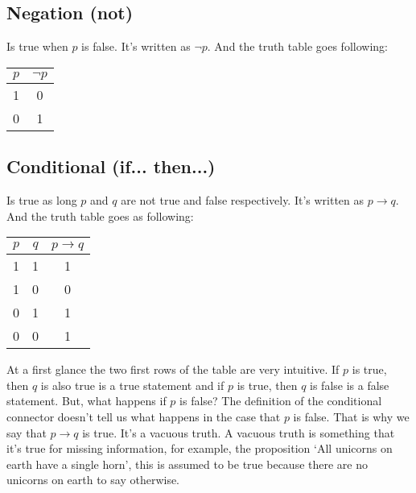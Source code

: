 \documentclass{report}
\begin{document}
    \subsection{Negation (not)}
        Is true when $p$ is false. It's written as $\neg p$. And the truth table goes following:

        \begin{table}[h]
            \centering
            \begin{tabular}{|c|c|}
            \hline
            $p$ & $\neg p$ \\ \hline
            1 & 0                        \\ \hline
            0 & 1                        \\ \hline
            \end{tabular}
        \end{table}
        \vspace{.5cm}

    \subsection{Conditional (if... then...)}
        Is true as long $p$ and $q$ are not true and false respectively. It's written as $p \rightarrow q$. And the truth table goes as following:

        \begin{table}[h]
            \centering
            \begin{tabular}{|c|c|c|}
            \hline
            $p$ & $q$ & $p \rightarrow q$ \\ \hline
            1 & 1 & 1                        \\ \hline
            1 & 0 & 0                        \\ \hline
            0 & 1 & 1                        \\ \hline
            0 & 0 & 1                        \\ \hline
            \end{tabular}
        \end{table}

        At a first glance the two first rows of the table are very intuitive. If $p$ is true, then $q$ is also true is a true statement and if $p$ is true, then $q$ is false is a false statement. But, what happens if $p$ is false? The definition of the conditional connector doesn't tell us what happens in the case that $p$ is false. That is why we say that $p \rightarrow q$ is true. It's a vacuous truth. A vacuous truth is something that it's true for missing information, for example, the proposition `All unicorns on earth have a single horn', this is assumed to be true because there are no unicorns on earth to say otherwise.
\end{document}
